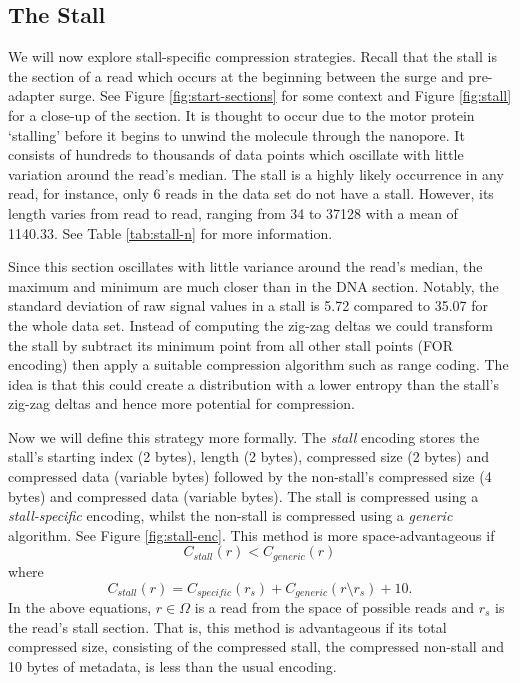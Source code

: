 \subsection{The Stall}



We will now explore stall-specific compression strategies.
Recall that the stall is the section of a read which occurs at
the beginning between the surge and pre-adapter surge. See Figure
\ref{fig:start-sections} for some context and Figure \ref{fig:stall} for a
close-up of the section. It is thought to occur due to the motor protein `stalling'
before it begins to unwind the molecule through the nanopore. It consists of
hundreds to thousands of data points which oscillate with little variation
around the read's median. The stall is a highly likely occurrence in any read,
for instance, only 6 reads in the data set do not have a stall.
However, its length varies from read to read, ranging from 34 to \num{37128}
with a mean of 1140.33. See Table \ref{tab:stall-n} for more information.



Since this section oscillates with little variance around the read's median,
the maximum and minimum are much closer than in the DNA section.
Notably, the standard deviation of raw signal values in a stall is 5.72 compared
to 35.07 for the whole data set.
Instead of computing the zig-zag deltas we could transform the stall by subtract
its minimum point from all other stall points (FOR encoding) then
apply a suitable compression algorithm such as range coding. The idea is that
this could create a distribution with a lower entropy than the stall's zig-zag
deltas and hence more potential for compression.

Now we will define this strategy more formally. The \textit{stall} encoding
stores the stall's starting index (2 bytes), length (2 bytes), compressed size
(2 bytes) and compressed data (variable bytes) followed by the non-stall's
compressed size (4 bytes) and compressed data (variable bytes). The stall is
compressed using a \textit{stall-specific} encoding, whilst the non-stall is
compressed using a \textit{generic} algorithm.  See Figure \ref{fig:stall-enc}.
This method is more space-advantageous if
\[ C_{stall}(r) < C_{generic}(r) \]
where
\[ C_{stall}(r) = C_{specific}(r_s) + C_{generic}(r\setminus r_s) + 10. \]
In the above equations, $r\in\Omega$ is a read from the space of possible reads and $r_s$ is the
read's stall section. That is, this method is advantageous if its total
compressed size, consisting of the compressed stall, the compressed non-stall
and 10 bytes of metadata, is less than the usual encoding.

